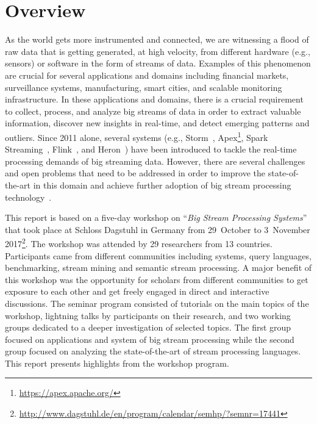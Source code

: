 \section{Overview}\label{sec:overview}

As the world gets more instrumented and connected, we are witnessing a
flood of raw data that is getting generated, at high velocity,
from different hardware (e.g., sensors) or software in the form of
streams of data. Examples of this phenomenon are crucial for several
applications and domains including financial markets, surveillance
systems, manufacturing, smart cities, and scalable monitoring
infrastructure. In these applications and domains, there is a crucial
requirement to collect, process, and analyze big streams of data in
order to extract valuable information, discover new insights in
real-time, and detect emerging patterns and outliers. Since 2011
alone, several systems (e.g.,
\textsf{Storm}~\cite{toshniwal_et_al_2014},
\textsf{Apex}\footnote{\url{https://apex.apache.org/}},
\textsf{Spark Streaming}~\cite{zaharia_et_al_2013},
\textsf{Flink}~\cite{carbone_et_al_2015}, and
\textsf{Heron}~\cite{kulkarni_et_al_2015}) have
been introduced to tackle the real-time processing demands of big streaming data. However, there are several challenges and open problems that need to be addressed in order to improve the state-of-the-art in this domain and achieve further adoption of big stream processing technology~\cite{sakr2016big}.

This report is based on a five-day workshop on ``\emph{Big Stream
  Processing Systems}'' that took place at Schloss Dagstuhl in Germany
from 29~October to 3~November 2017\footnote{\url{http://www.dagstuhl.de/en/program/calendar/semhp/?semnr=17441}}. The workshop was attended by 29 researchers from  13 countries. Participants came from different communities including systems, query languages, benchmarking, stream mining and semantic stream processing. A major benefit of this workshop was the opportunity for scholars from different communities to get exposure to each other and get freely engaged in direct and interactive discussions. The seminar program consisted of tutorials on the main topics of the workshop, lightning talks by participants on their research, and two working groups dedicated to a deeper investigation of selected topics. The first group focused on applications and system of big stream processing while the second group focused on analyzing the state-of-the-art of stream processing languages. This report presents highlights from the workshop program.
